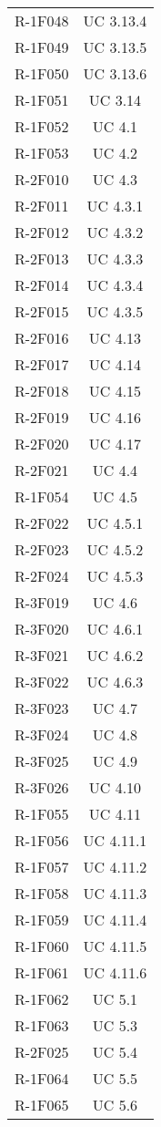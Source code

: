 \begin{tabularx}{\textwidth}{c|c}
		R-1F048 & UC 3.13.4 \\
		R-1F049 & UC 3.13.5 \\
		R-1F050 & UC 3.13.6 \\
		R-1F051 & UC 3.14 \\
		R-1F052 & UC 4.1 \\
		R-1F053 & UC 4.2 \\
		R-2F010 & UC 4.3 \\
		R-2F011 & UC 4.3.1 \\
		R-2F012 & UC 4.3.2 \\
		R-2F013 & UC 4.3.3 \\
		R-2F014 & UC 4.3.4 \\
		R-2F015 & UC 4.3.5 \\
		R-2F016 & UC 4.13 \\
		R-2F017 & UC 4.14 \\
		R-2F018 & UC 4.15 \\
		R-2F019 & UC 4.16 \\
		R-2F020 & UC 4.17 \\
		R-2F021 & UC 4.4 \\
		R-1F054 & UC 4.5 \\
		R-2F022 & UC 4.5.1 \\
		R-2F023 & UC 4.5.2 \\
		R-2F024 & UC 4.5.3 \\
		R-3F019 & UC 4.6 \\
		R-3F020 & UC 4.6.1 \\
		R-3F021 & UC 4.6.2 \\
		R-3F022 & UC 4.6.3 \\
		R-3F023 & UC 4.7 \\
		R-3F024 & UC 4.8 \\
		R-3F025 & UC 4.9 \\
		R-3F026 & UC 4.10 \\
		R-1F055 & UC 4.11 \\
		R-1F056 & UC 4.11.1 \\
		R-1F057 & UC 4.11.2 \\
		R-1F058 & UC 4.11.3 \\
		R-1F059 & UC 4.11.4 \\
		R-1F060 & UC 4.11.5 \\
		R-1F061 & UC 4.11.6 \\
		R-1F062 & UC 5.1 \\
		R-1F063 & UC 5.3 \\
		R-2F025 & UC 5.4 \\
		R-1F064 & UC 5.5 \\
		R-1F065 & UC 5.6 \\

\end{tabularx}
